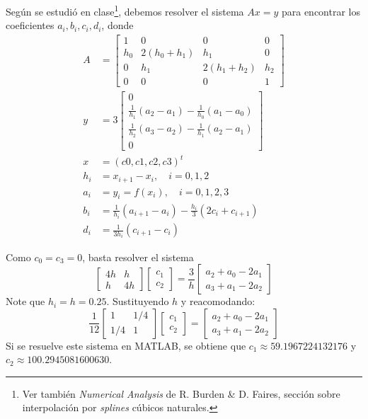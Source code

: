 Según se estudió en clase\footnote{Ver también \emph{Numerical Analysis} de R. Burden \& D. Faires, sección sobre interpolación por \emph{splines} cúbicos naturales.}, debemos resolver el sistema $Ax=y$ para encontrar los coeficientes $a_i,b_i,c_i,d_i$, donde
\begin{align*}
	A&=
	\begin{bmatrix}
		1 & 0 & 0 & 0 \\
		h_0 & 2(h_0+h_1) & h_1 & 0 \\
		0 & h_1 & 2(h_1+h_2) & h_2 \\
		0 & 0 & 0 & 1
	\end{bmatrix}\\
	y& = 3
	\begin{bmatrix}
		0\\
		\frac{1}{h_1}(a_2-a_1)-\frac{1}{h_0}(a_1-a_0)\\
		\frac{1}{h_2}(a_3-a_2)-\frac{1}{h_1}(a_2-a_1)\\
		0
	\end{bmatrix}\\
	x&=(c0,c1,c2,c3)^t\\
	h_i&=x_{i+1}-x_{i},\quad i=0,1,2\\
	a_i&=y_i=f(x_i),\quad i=0,1,2,3\\
	b_i&=\frac{1}{h_i}(a_{i+1}-a_i)-\frac{h_i}{3}(2c_i+c_{i+1})\\
	d_i&=\frac{1}{3h_i}(c_{i+1}-c_i)
\end{align*}

Como $c_0=c_3=0$, basta resolver el sistema
\[
	\begin{bmatrix}
		4h & h \\
		h & 4h
	\end{bmatrix}
	\begin{bmatrix}
		c_1\\
		c_2
	\end{bmatrix}
	=
	\frac{3}{h}
	\begin{bmatrix}
		a_2+a_0-2a_1\\
		a_3+a_1-2a_2
	\end{bmatrix}
\]
Note que $h_i=h=0.25$. Sustituyendo $h$ y reacomodando:
\[
\frac{1}{12}
\begin{bmatrix}
1 & 1/4 \\
1/4 & 1
\end{bmatrix}
\begin{bmatrix}
c_1\\
c_2
\end{bmatrix}
=
\begin{bmatrix}
a_2+a_0-2a_1\\
a_3+a_1-2a_2
\end{bmatrix}
\]
Si se resuelve este sistema en MATLAB, se obtiene que $c_1\approx59.1967224132176$ y $c_2\approx100.2945081600630$.

